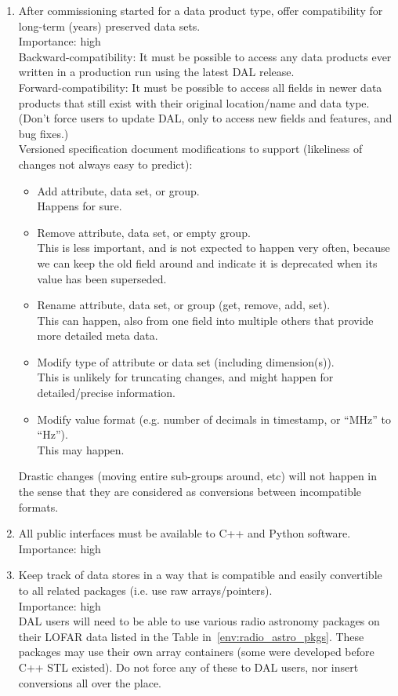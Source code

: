 \documentclass[a4paper,11pt]{article}
\begin{document}
\begin{enumerate}[label=\it R.\arabic{*}]
\item \label{req:long-term_compat} After commissioning started for a data product type, offer compatibility for long-term (years) preserved data sets.\\
Importance: high\\
Backward-compatibility: It must be possible to access any data products ever written in a production run using the latest DAL release.\\
Forward-compatibility: It must be possible to access all fields in newer data products that still exist with their original location/name and data type. (Don't force users to update DAL, only to access new fields and features, and bug fixes.)\\
Versioned specification document modifications to support (likeliness of changes not always easy to predict):
\begin{itemize}
\itemsep0em
\item Add attribute, data set, or group.\\
Happens for sure.
\item Remove attribute, data set, or empty group.\\
This is less important, and is not expected to happen very often, because we can keep the old field around and indicate it is deprecated when its value has been superseded.
\item Rename attribute, data set, or group (get, remove, add, set).\\
This can happen, also from one field into multiple others that provide more detailed meta data.
\item Modify type of attribute or data set (including dimension(s)).\\
This is unlikely for truncating changes, and might happen for detailed/precise information.
\item Modify value format (e.g. number of decimals in timestamp, or ``MHz'' to ``Hz'').\\
This may happen.
\end{itemize}
Drastic changes (moving entire sub-groups around, etc) will not happen in the sense that they are considered as conversions between incompatible formats.

\item \label{req:lang_interfaces} All public interfaces must be available to C++ and Python software.\\
Importance: high\\

\item \label{req:data_store_compat} Keep track of data stores in a way that is compatible and easily convertible to all related packages (i.e. use raw arrays/pointers).\\
Importance: high\\
DAL users will need to be able to use various radio astronomy packages on their LOFAR data listed in the Table in~\ref{env:radio_astro_pkgs}.
These packages may use their own array containers (some were developed before C++ STL existed).
Do not force any of these to DAL users, nor insert conversions all over the place.


\end{enumerate}
\end{document}
